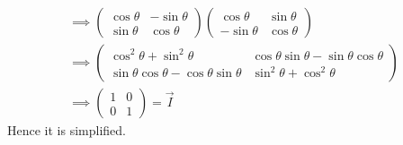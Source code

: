 \documentclass[journal,12pt,twocolumn]{IEEEtran}
\begin{document}
\begin{gather}
    \implies\left(\begin{array}{cc}\cos\theta & -\sin\theta \\ \sin\theta & \cos\theta\end{array}\right)\left(\begin{array}{cc}\cos\theta & \sin\theta \\ -\sin\theta & \cos\theta\end{array}\right)\\
    \implies\left(\begin{array}{cc}\cos^2\theta+\sin^2\theta & \cos\theta\sin\theta-\sin\theta\cos\theta \\ \sin\theta\cos\theta-\cos\theta\sin\theta & \sin^2\theta+\cos^2\theta\end{array}\right)\\
    \implies\left(\begin{array}{cc} 1 & 0 \\ 0 & 1\end{array}\right)=\vec{I}
\end{gather}
Hence it is simplified.
\end{document}
